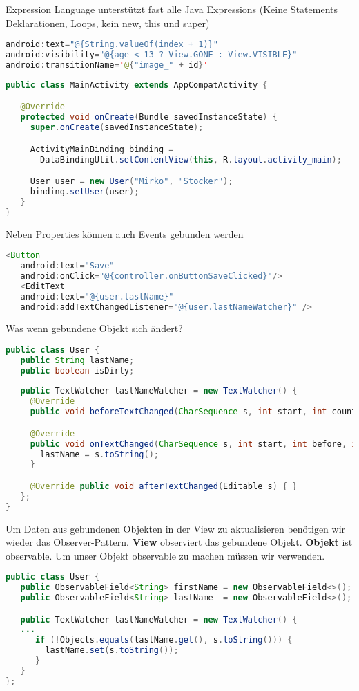 Expression Language unterstützt fast alle Java Expressions (Keine Statements Deklarationen, Loops, kein new, this und super)
\begin{lstlisting}[language=java]
android:text="@{String.valueOf(index + 1)}"
android:visibility="@{age < 13 ? View.GONE : View.VISIBLE}"
android:transitionName='@{"image_" + id}'
\end{lstlisting}
\begin{lstlisting}[language=java]
public class MainActivity extends AppCompatActivity {

   @Override
   protected void onCreate(Bundle savedInstanceState) {
     super.onCreate(savedInstanceState);

     ActivityMainBinding binding = 
       DataBindingUtil.setContentView(this, R.layout.activity_main);

     User user = new User("Mirko", "Stocker");
     binding.setUser(user);
   }
}
\end{lstlisting}
Neben Properties können auch Events gebunden werden
\begin{lstlisting}[language=java]
<Button
   android:text="Save"
   android:onClick="@{controller.onButtonSaveClicked}"/>
   <EditText
   android:text="@{user.lastName}"
   android:addTextChangedListener="@{user.lastNameWatcher}" />
\end{lstlisting}
Was wenn gebundene Objekt sich ändert?
\begin{lstlisting}[language=java]
public class User {
   public String lastName;
   public boolean isDirty;
  
   public TextWatcher lastNameWatcher = new TextWatcher() {
     @Override
     public void beforeTextChanged(CharSequence s, int start, int count, int after) { }

     @Override
     public void onTextChanged(CharSequence s, int start, int before, int count) {
       lastName = s.toString();
     }

     @Override public void afterTextChanged(Editable s) { }
   };
}
\end{lstlisting}
Um Daten aus gebundenen Objekten in der View zu aktualisieren benötigen wir wieder das Observer-Pattern. \textbf{View} observiert das gebundene Objekt. \textbf{Objekt} ist observable. Um unser Objekt observable zu machen müssen wir  verwenden.
\begin{lstlisting}[language=java]
public class User {
   public ObservableField<String> firstName = new ObservableField<>();
   public ObservableField<String> lastName  = new ObservableField<>();

   public TextWatcher lastNameWatcher = new TextWatcher() {
   ...
      if (!Objects.equals(lastName.get(), s.toString())) {
        lastName.set(s.toString());
      }
   }
};
\end{lstlisting}

